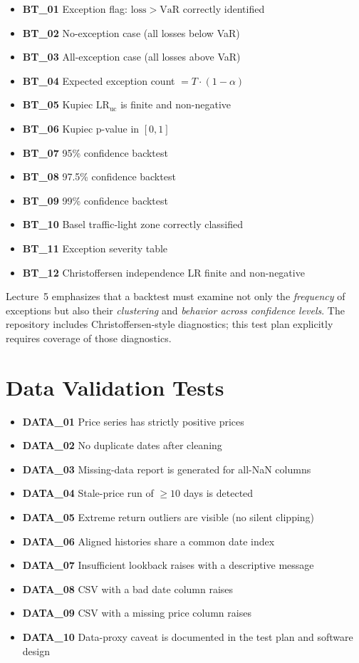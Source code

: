 \documentclass[11pt]{article}
\begin{document}
\begin{itemize}
  \item \textbf{BT\_01} Exception flag: $\mathrm{loss} > \mathrm{VaR}$ correctly identified
  \item \textbf{BT\_02} No-exception case (all losses below VaR)
  \item \textbf{BT\_03} All-exception case (all losses above VaR)
  \item \textbf{BT\_04} Expected exception count $= T \cdot (1-\alpha)$
  \item \textbf{BT\_05} Kupiec $\mathrm{LR}_{\mathrm{uc}}$ is finite and non-negative
  \item \textbf{BT\_06} Kupiec p-value in $[0,1]$
  \item \textbf{BT\_07} 95\% confidence backtest
  \item \textbf{BT\_08} 97.5\% confidence backtest
  \item \textbf{BT\_09} 99\% confidence backtest
  \item \textbf{BT\_10} Basel traffic-light zone correctly classified
  \item \textbf{BT\_11} Exception severity table
  \item \textbf{BT\_12} Christoffersen independence LR finite and non-negative
\end{itemize}

Lecture~5 emphasizes that a backtest must examine not only the
\emph{frequency} of exceptions but also their \emph{clustering} and
\emph{behavior across confidence levels}.  The repository includes
Christoffersen-style diagnostics; this test plan explicitly requires
coverage of those diagnostics.

\section{Data Validation Tests}

\begin{itemize}
  \item \textbf{DATA\_01} Price series has strictly positive prices
  \item \textbf{DATA\_02} No duplicate dates after cleaning
  \item \textbf{DATA\_03} Missing-data report is generated for all-NaN columns
  \item \textbf{DATA\_04} Stale-price run of $\geq 10$ days is detected
  \item \textbf{DATA\_05} Extreme return outliers are visible (no silent clipping)
  \item \textbf{DATA\_06} Aligned histories share a common date index
  \item \textbf{DATA\_07} Insufficient lookback raises with a descriptive message
  \item \textbf{DATA\_08} CSV with a bad date column raises
  \item \textbf{DATA\_09} CSV with a missing price column raises
  \item \textbf{DATA\_10} Data-proxy caveat is documented in the test plan and software design
\end{itemize}
\end{document}
